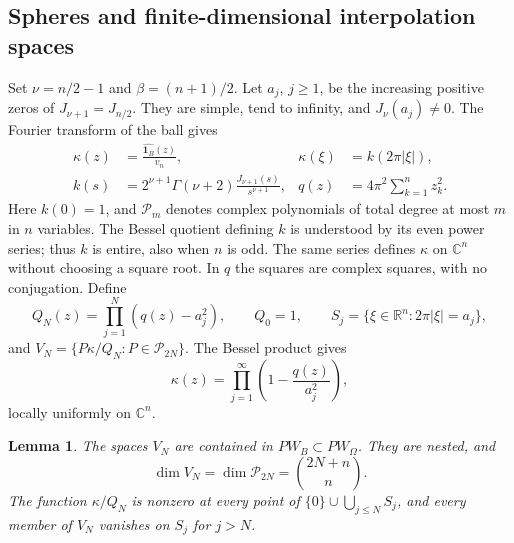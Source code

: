 \documentclass[a4paper,12pt,reqno]{amsart}
\newtheorem{lemma}[theorem]{Lemma}
\theoremstyle{remark}
\numberwithin{equation}{section}
\newcommand{\R}{\mathbb R}
\newcommand{\C}{\mathbb C}
\newcommand{\one}{\mathbf 1}
\newcommand{\cP}{\mathcal P}
\begin{document}
\subsection{Spheres and finite-dimensional interpolation spaces}

Set $\nu=n/2-1$ and $\beta=(n+1)/2$. Let $a_j$, $j\geq1$,
be the increasing positive zeros of $J_{\nu+1}=J_{n/2}$.
They are simple, tend to infinity, and $J_\nu(a_j)\ne0$.
The Fourier transform of the ball gives
\begin{equation}\label{cm:eq:definitions}
 \begin{aligned}
 \kappa(z)&=\frac{\widehat{\one_B}(z)}{v_n},
 &\kappa(\xi)&=k(2\pi|\xi|),\\
 k(s)&=2^{\nu+1}\Gamma(\nu+2)\frac{J_{\nu+1}(s)}{s^{\nu+1}},
 &q(z)&=4\pi^2\sum_{k=1}^n z_k^2.
 \end{aligned}
\end{equation}
Here $k(0)=1$, and $\cP_m$ denotes complex polynomials of total
degree at most $m$ in $n$ variables. The Bessel quotient defining
$k$ is understood by its even power series; thus $k$ is entire,
also when $n$ is odd. The same series defines $\kappa$ on $\C^n$
without choosing a square root. In $q$ the squares are complex
squares, with no conjugation. Define
\[
 Q_N(z)=\prod_{j=1}^N(q(z)-a_j^2),\qquad Q_0=1,
 \qquad S_j=\{\xi\in\R^n:2\pi|\xi|=a_j\},
\]
and $V_N=\{P\kappa/Q_N:P\in\cP_{2N}\}$.
The Bessel product gives
\begin{equation}\label{cm:eq:product}
 \kappa(z)=\prod_{j=1}^\infty\left(1-\frac{q(z)}{a_j^2}\right),
\end{equation}
locally uniformly on $\C^n$.

\begin{lemma}\label{cm:lem:membership}
The spaces $V_N$ are contained in $PW_B\subset PW_\Omega$.
They are nested, and
\[
 \dim V_N=\dim\cP_{2N}=\binom{2N+n}{n}.
\]
The function $\kappa/Q_N$ is nonzero at every point of
$\{0\}\cup\bigcup_{j\leq N}S_j$, and every member of $V_N$
vanishes on $S_j$ for $j>N$.
\end{lemma}
\end{document}
